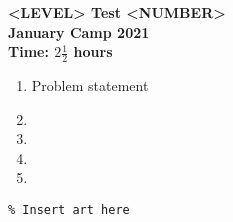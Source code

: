 \documentclass{article}
\begin{document}
\thispagestyle{empty}

\begin{center}
  \textbf{\Large <LEVEL> Test <NUMBER>}
  \\ \vspace{1em}
  \textbf{\large January Camp 2021}
  \\ \vspace{1em}
  \textbf{\large Time: $2\frac{1}{2}$ hours}
\end{center}

\vspace{24pt}

\begin{enumerate}[1.]

\item %
Problem statement


\item %


\item %


\item %


\item %

\end{enumerate}


\vfill
\centering
\begin{BVerbatim}
\end{BVerbatim}
\end{document}

